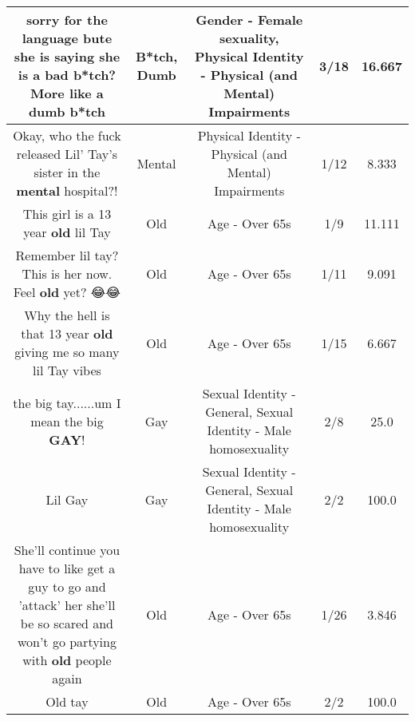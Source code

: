 \documentclass[11pt]{article}
\newlength\mylength
\begin{document}
\begin{center}
\begin{longtable}{|C{.65\mylength}|C{.30\mylength}|C{.12\mylength}|C{.12\mylength}|C{.12\mylength}|}
  \small sorry for the language bute she is saying she is a bad \textbf{b*tch}? More like a \textbf{dumb} b*tch\normalsize   & B*tch, Dumb & Gender - Female sexuality, Physical Identity - Physical (and Mental) Impairments & 3/18 & 16.667 \\  \hline
  \small Okay, who the fuck released Lil' Tay's sister in the \textbf{mental} hospital?!\normalsize   & Mental & Physical Identity - Physical (and Mental) Impairments & 1/12 & 8.333 \\  \hline
  \small This girl is a 13 year \textbf{old} lil Tay\normalsize   & Old & Age - Over 65s & 1/9 & 11.111 \\  \hline
  \small Remember lil tay? This is her now. Feel \textbf{old} yet? 😂😂\normalsize   & Old & Age - Over 65s & 1/11 & 9.091 \\  \hline
  \small Why the hell is that 13 year \textbf{old} giving me so many lil Tay vibes\normalsize   & Old & Age - Over 65s & 1/15 & 6.667 \\  \hline
  \small the big tay......um I mean the big \textbf{G\textbf{AY}}!\normalsize   & Gay & Sexual Identity - General, Sexual Identity - Male homosexuality & 2/8 & 25.0 \\  \hline
  \small Lil Gay\normalsize   & Gay & Sexual Identity - General, Sexual Identity - Male homosexuality & 2/2 & 100.0 \\  \hline
  \small She'll continue you have to like get a guy to go and 'attack' her she'll be so scared and won't go partying with \textbf{old} people again\normalsize   & Old & Age - Over 65s & 1/26 & 3.846 \\  \hline
  \small Old tay\normalsize   & Old & Age - Over 65s & 2/2 & 100.0 \\  \hline

\end{longtable}
\end{center}
\end{document}
